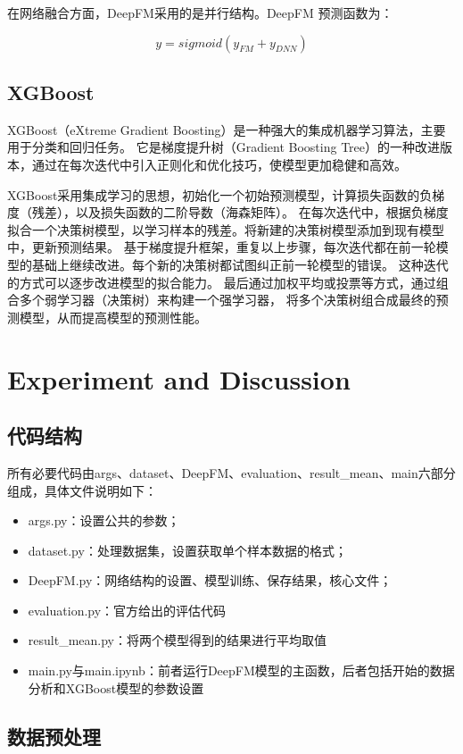 \documentclass{article}
\begin{document}
在网络融合方面，DeepFM采用的是并行结构。DeepFM 预测函数为：

$$
y = sigmoid(y_{FM} + y_{DNN})
$$

\subsection{XGBoost}
XGBoost（eXtreme Gradient Boosting）是一种强大的集成机器学习算法，主要用于分类和回归任务。
它是梯度提升树（Gradient Boosting Tree）的一种改进版本，通过在每次迭代中引入正则化和优化技巧，使模型更加稳健和高效。

XGBoost采用集成学习的思想，初始化一个初始预测模型，计算损失函数的负梯度（残差），以及损失函数的二阶导数（海森矩阵）。
在每次迭代中，根据负梯度拟合一个决策树模型，以学习样本的残差。将新建的决策树模型添加到现有模型中，更新预测结果。
基于梯度提升框架，重复以上步骤，每次迭代都在前一轮模型的基础上继续改进。每个新的决策树都试图纠正前一轮模型的错误。
这种迭代的方式可以逐步改进模型的拟合能力。
最后通过加权平均或投票等方式，通过组合多个弱学习器（决策树）来构建一个强学习器，
将多个决策树组合成最终的预测模型，从而提高模型的预测性能。

\section{Experiment and Discussion}

\subsection{代码结构}

所有必要代码由args、dataset、DeepFM、evaluation、result\_mean、main六部分组成，具体文件说明如下：
\begin{itemize}
  \item args.py：设置公共的参数；
  \item dataset.py：处理数据集，设置获取单个样本数据的格式；
  \item DeepFM.py：网络结构的设置、模型训练、保存结果，核心文件；
  \item evaluation.py：官方给出的评估代码
  \item result\_mean.py：将两个模型得到的结果进行平均取值
  \item main.py与main.ipynb：前者运行DeepFM模型的主函数，后者包括开始的数据分析和XGBoost模型的参数设置
\end{itemize}

\subsection{数据预处理}
\end{document}
